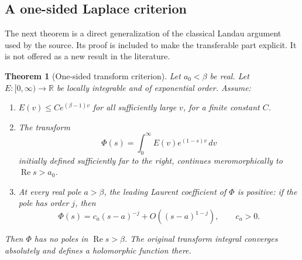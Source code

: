 \documentclass[11pt,letterpaper]{article}
\newtheorem{theorem}{Theorem}[section]
\theoremstyle{definition}
\theoremstyle{remark}
\newcommand{\R}{\mathbb R}
\newcommand{\Rea}{\operatorname{Re}}
\begin{document}
\subsection{A one-sided Laplace criterion}

The next theorem is a direct generalization of the classical Landau
argument used by the source. Its proof is included to make the transferable
part explicit. It is not offered as a new result in the literature.

\begin{theorem}[One-sided transform criterion]\label{thm:landau}
Let \(a_0<\beta\) be real. Let
\(E:[0,\infty)\to\R\) be locally integrable and of exponential order.
Assume:
\begin{enumerate}[label=(\roman*)]
\item \(E(v)\le C e^{(\beta-1)v}\) for all sufficiently large \(v\),
for a finite constant \(C\).
\item The transform
\[
 \Phi(s)=\int_0^\infty E(v)e^{(1-s)v}\,dv
\]
initially defined sufficiently far to the right, continues meromorphically
to \(\Rea s>a_0\).
\item At every real pole \(a>\beta\), the leading Laurent coefficient of
\(\Phi\) is positive: if the pole has order \(j\), then
\[
 \Phi(s)=c_a(s-a)^{-j}+O((s-a)^{1-j}),\qquad c_a>0.
\]
\end{enumerate}
Then \(\Phi\) has no poles in \(\Rea s>\beta\). The original transform
integral converges absolutely and defines a holomorphic function there.
\end{theorem}
\end{document}
